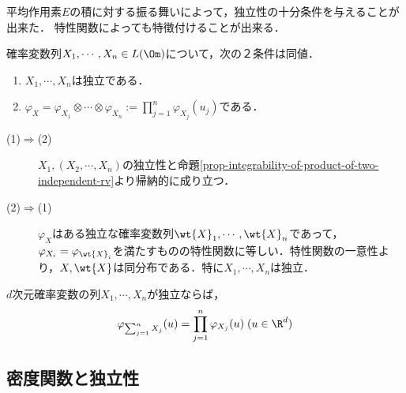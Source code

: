 \documentclass[uplatex,dvipdfmx]{jsreport}
\begin{document}
\begin{tcolorbox}[colframe=ForestGreen, colback=ForestGreen!10!white,breakable,colbacktitle=ForestGreen!40!white,coltitle=black,fonttitle=\bfseries\sffamily,
title=]
    平均作用素$E$の積に対する振る舞いによって，独立性の十分条件を与えることが出来た．
    特性関数によっても特徴付けることが出来る．
\end{tcolorbox}

\begin{theorem}[Kac]\label{thm-Kac}
    確率変数列$X_1,\cdots,X_n\in L(\Om)$について，次の２条件は同値．
    \begin{enumerate}
        \item $X_1,\cdots,X_n$は独立である．
        \item $\varphi_X=\varphi_{X_1}\otimes\cdots\otimes\varphi_{X_n}:=\prod_{j=1}^n\varphi_{X_j}(u_j)$である．
    \end{enumerate}
\end{theorem}
\begin{Proof}\mbox{}
    \begin{description}
        \item[(1)$\Rightarrow$(2)] $X_1,(X_2,\cdots,X_n)$の独立性と命題\ref{prop-integrability-of-product-of-two-independent-rv}より帰納的に成り立つ．
        \item[(2)$\Rightarrow$(1)] $\varphi_X$はある独立な確率変数列$\wt{X}_1,\cdots,\wt{X}_n$であって，$\varphi_{X_i}=\varphi_{\wt{X}_i}$を満たすものの特性関数に等しい．特性関数の一意性より，$X,\wt{X}$は同分布である．特に$X_1,\cdots,X_n$は独立．
    \end{description}
\end{Proof}

\begin{corollary}
    $d$次元確率変数の列$X_1,\cdots,X_n$が独立ならば，
    \[\varphi_{\sum_{j=1}^nX_j}(u)=\prod^n_{j=1}\varphi_{X_j}(u)\;(u\in\R^d)\]
\end{corollary}

\subsection{密度関数と独立性}
\end{document}
